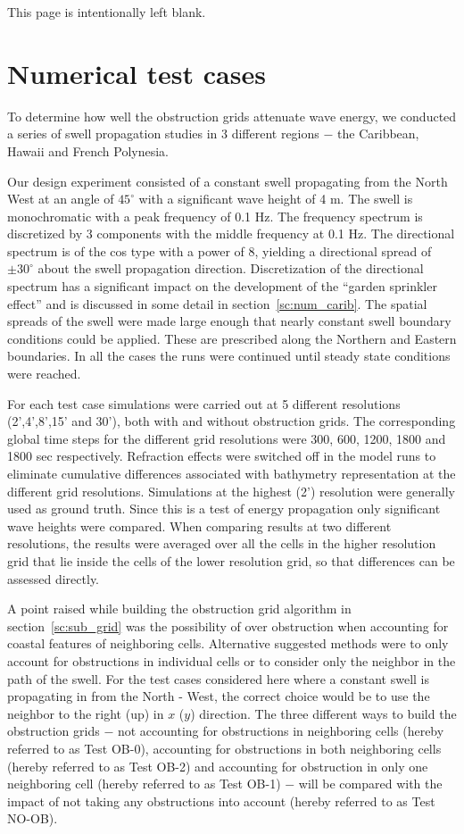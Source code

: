 \documentclass[12pt]{article}
\newcommand{\pb}{\strut \vfill \pagebreak}
\newcommand{\bpage}{\vfill \pagebreak \strut

\vspace{2.5in} \centerline{This page is intentionally left blank.}}
\newcommand{\newsec}{\setcounter{equation}{0}
                     \setcounter{myfigno}{0}
                     \setcounter{mytabno}{0}}
\newcounter{myfigno}[section]
\newcounter{mytabno}[section]
\begin{document}
\bpage
\pb

\section {Numerical test cases}
\label{sc:num_exp}
\newsec
To determine how well the obstruction grids attenuate wave energy, we conducted a series of swell propagation studies in 3 different regions $-$ the Caribbean, Hawaii and French Polynesia.  

Our design experiment consisted of a constant swell propagating from the North West at an angle of $45^\circ$ with a significant wave height of 4 m. The swell is monochromatic with a peak frequency of 0.1 Hz. The frequency spectrum is discretized by 3 components with the middle frequency at 0.1 Hz. The directional spectrum is of the cos type with a power of 8, yielding a directional spread of $\pm 30^\circ$ about the swell propagation direction. Discretization of the directional spectrum has a significant impact on the development of the ``garden sprinkler effect'' \cite[]{boho-1987} and is discussed in some detail in section~\ref{sc:num_carib}. The spatial spreads of the swell were made large enough that nearly constant swell boundary conditions could be applied. These are prescribed along the Northern and Eastern boundaries. In all the cases the runs were continued until steady state conditions were reached. 

For each test case simulations were carried out at 5 different resolutions (2',4',8',15' and 30'), both with and without obstruction grids. The corresponding global time steps for the different grid resolutions were 300, 600, 1200, 1800 and 1800 sec respectively. Refraction effects were switched off in the model runs to eliminate cumulative differences associated with bathymetry representation at the different grid resolutions. Simulations at the highest (2') resolution were generally used as ground truth. Since this is a test of energy propagation only significant wave heights were compared. When comparing results at two different resolutions, the results were averaged over all the cells in the higher resolution grid that lie inside the cells of the lower resolution grid, so that differences can be assessed directly.

A point raised while building the obstruction grid algorithm in section~\ref{sc:sub_grid} was the possibility of over obstruction when accounting for coastal features of neighboring cells. Alternative suggested methods were to only account for obstructions in individual cells or to consider only the neighbor in the path of the swell. For the test cases considered here where a constant swell is propagating in from the North - West, the correct choice would be to use the neighbor to the right (up) in $x$ ($y$) direction. The three different ways to build the obstruction grids $-$ not accounting for obstructions in neighboring cells (hereby referred to as Test OB-0), accounting for obstructions in both neighboring cells (hereby referred to as Test OB-2) and accounting for obstruction in only one neighboring cell (hereby referred to as Test OB-1) $-$ will be compared with the impact of not taking any obstructions into account (hereby referred to as Test NO-OB).  
\end{document}
